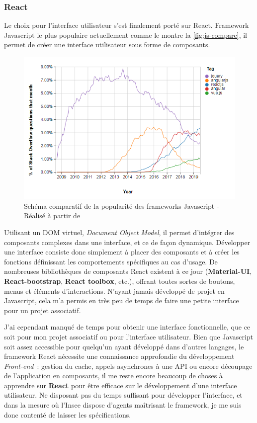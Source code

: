 \subsubsection*{React}
Le choix pour l'interface utilisateur s'est finalement porté sur React. Framework Javascript le plus populaire actuellement comme le montre la \autoref{fig:js-compare}, il permet de créer une interface utilisateur sous forme de composants.

\begin{figure}[H]
    \centering
    \includegraphics{images/js-frameworks.png}
    \caption{Schéma comparatif de la popularité des frameworks Javascript - Réalisé à partir de \cite{stackoverflow-trend}}
    \label{fig:js-compare}
\end{figure}

Utilisant un DOM virtuel, \textit{Document Object Model}, il permet d'intégrer des composants complexes dans une interface, et ce de façon dynamique. Développer une interface consiste donc simplement à placer des composants et à créer les fonctions définissant les comportements spécifiques au cas d'usage. De nombreuses bibliothèques de composants React existent à ce jour (\textbf{Material-UI}, \textbf{React-bootstrap}, \textbf{React toolbox}, etc.), offrant toutes sortes de boutons, menus et éléments d'interactions. N'ayant jamais développé de projet en Javascript, cela m'a permis en très peu de temps de faire une petite interface pour un projet associatif.
\newline

J'ai cependant manqué de temps pour obtenir une interface fonctionnelle, que ce soit pour mon projet associatif ou pour l'interface utilisateur. Bien que Javascript soit assez accessible pour quelqu'un ayant développé dans d'autres langages, le framework React nécessite une connaissance approfondie du développement \textit{Front-end}~: gestion du cache, appels asynchrones à une API ou encore découpage de l'application en composants, il me reste encore beaucoup de choses à apprendre sur \textbf{React} pour être efficace sur le développement d'une interface utilisateur. Ne disposant pas du temps suffisant pour développer l'interface, et dans la mesure où l'Insee dispose d'agents maîtrisant le framework, je me suis donc contenté de laisser les spécifications.
\newline

